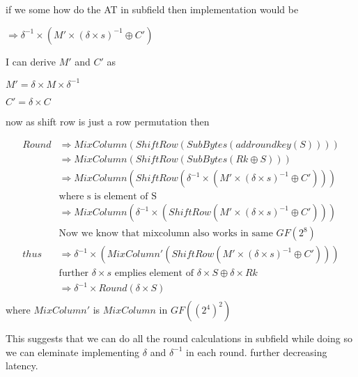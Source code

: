 \documentclass[a4paper,11pt]{article}
\begin{document}
if we some how do the AT in subfield then implementation would be

$\Rightarrow \delta^{-1} \times ( M' \times (\delta \times s)^{-1} \oplus C')$

I can derive $M'$ and $C'$ as

$M' = \delta \times M \times \delta^{-1}$

$C' = \delta \times C$

now as shift row is just a row permutation then


\begin{equation}
\begin{split}
Round & \Rightarrow MixColumn(ShiftRow(SubBytes(addroundkey(S)))) \\
 & \Rightarrow MixColumn(ShiftRow(SubBytes(Rk \oplus S))) \\
 & \Rightarrow MixColumn(ShiftRow(\delta^{-1} \times ( M' \times (\delta \times s)^{-1} \oplus C')))\\
 & \text{where s is element of S}\\
 & \Rightarrow MixColumn(\delta^{-1} \times (ShiftRow(M' \times (\delta \times s)^{-1} \oplus C')))\\ 
 & \text{Now we know that mixcolumn also works in same $GF(2^8)$}\\
 thus &\Rightarrow \delta^{-1} \times (MixColumn'(ShiftRow(M' \times (\delta \times s)^{-1} \oplus C')))\\ 
 & \text{further $\delta \times s$ emplies element of $\delta \times S \oplus \delta \times Rk$}\\
 & \Rightarrow \delta^{-1} \times Round(\delta \times S)\\
\end{split}
\end{equation}
where $MixColumn'$ is $MixColumn$ in $GF((2^4)^2)$

This suggests that we can do all the round calculations in subfield while doing so we can eleminate implementing $\delta$ and $\delta^{-1}$ in each round. further decreasing latency.
\end{document}
